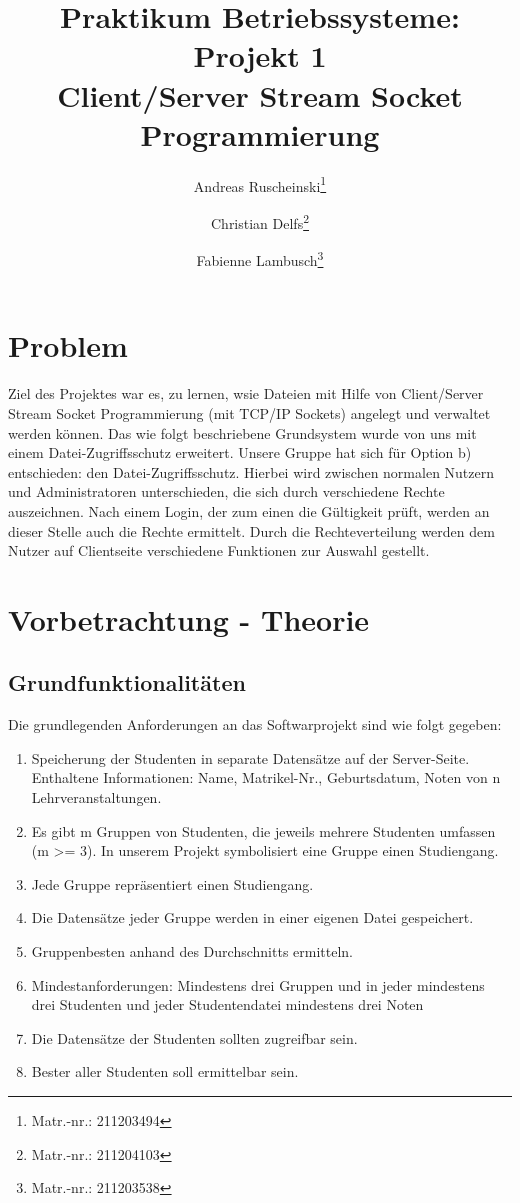 \documentclass{scrartcl}
\title{Praktikum Betriebssysteme: Projekt 1\\ Client/Server Stream Socket Programmierung}
\author{Andreas Ruscheinski\thanks{Matr.-nr.: 211203494}\and Christian Delfs\thanks{Matr.-nr.: 211204103}\and Fabienne Lambusch\thanks{Matr.-nr.: 211203538}}
\begin{document}
\maketitle
\tableofcontents

\section{Problem}
	Ziel des Projektes war es, zu lernen, wsie Dateien mit Hilfe von Client/Server Stream Socket Programmierung (mit TCP/IP Sockets) angelegt und verwaltet werden können. Das wie folgt beschriebene Grundsystem wurde von uns mit einem Datei-Zugriffsschutz erweitert. 
	Unsere Gruppe hat sich für Option b) entschieden: den Datei-Zugriffsschutz. Hierbei wird zwischen normalen Nutzern und Administratoren unterschieden, die sich durch verschiedene Rechte auszeichnen. Nach einem Login, der zum einen die Gültigkeit prüft, werden an dieser Stelle auch die Rechte ermittelt. Durch die Rechteverteilung werden dem Nutzer auf Clientseite verschiedene Funktionen zur Auswahl gestellt.\\

\section{Vorbetrachtung - Theorie}
	\subsection{Grundfunktionalitäten}
		Die grundlegenden Anforderungen an das Softwarprojekt sind wie folgt gegeben:
		\begin{enumerate}
		\item Speicherung der Studenten in separate Datensätze auf der Server-Seite. Enthaltene Informationen: Name, Matrikel-Nr., Geburtsdatum, Noten von n
		Lehrveranstaltungen.
		\item Es gibt m Gruppen von Studenten, die jeweils mehrere Studenten umfassen (m >= 3). In unserem Projekt symbolisiert eine Gruppe einen Studiengang.
		\item Jede Gruppe repräsentiert einen Studiengang.
		\item Die Datensätze jeder Gruppe werden in einer eigenen Datei gespeichert.
		\item Gruppenbesten anhand des Durchschnitts ermitteln.
		\item Mindestanforderungen: Mindestens drei Gruppen und in jeder mindestens drei Studenten und jeder Studentendatei mindestens drei Noten
		\item Die Datensätze der Studenten sollten zugreifbar sein.
		\item Bester aller Studenten soll ermittelbar sein.
		
		\end{enumerate}
\end{document}
